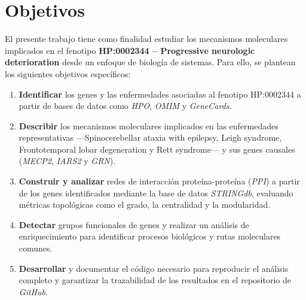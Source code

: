 \section{Objetivos}
El presente trabajo tiene como finalidad estudiar los mecanismos moleculares implicados en el fenotipo \textbf{HP:0002344 – Progressive neurologic deterioration} desde un enfoque de biología de sistemas. Para ello, se plantean los siguientes objetivos específicos:

	
\begin{enumerate}
	
		\item \textbf{Identificar} los genes y las enfermedades asociadas al fenotipo HP:0002344 a partir de bases de datos como \textit{HPO}, \textit{OMIM} y \textit{GeneCards}.
		
		\item \textbf{Describir} los mecanismos moleculares implicados en las enfermedades representativas —Spinocerebellar ataxia with epilepsy, Leigh syndrome, Frontotemporal lobar degeneration y Rett syndrome— y sus genes causales (\textit{MECP2}, \textit{IARS2} y \textit{GRN}).
		
		\item \textbf{Construir y analizar} redes de interacción proteína-proteína (\textit{PPI}) a partir de los genes identificados mediante la base de datos \textit{STRINGdb}, evaluando métricas topológicas como el grado, la centralidad y la modularidad.
		
		\item \textbf{Detectar} grupos funcionales de genes y realizar un análisis de enriquecimiento para identificar procesos biológicos y rutas moleculares comunes.
		
		\item \textbf{Desarrollar} y documentar el código necesario para reproducir el análisis completo y garantizar la trazabilidad de los resultados en el repositorio de \textit{GitHub}.
	\end{enumerate}
